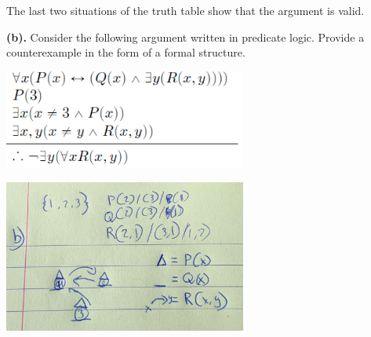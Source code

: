 \documentclass[a4paper]{article}
\begin{document}
The last two situations of the truth table show that the argument is valid.\\

\newpage

\textbf{(b).} Consider the following argument written in predicate logic. Provide a counterexample in the form of a formal structure.\\
\begin{center}
    \includegraphics[width=0.6\textwidth]{images/5b.png}\\[1cm]
\end{center}

\begin{center}
    \includegraphics[width=0.6\textwidth]{images/5ba.jpeg}\\[1cm]
\end{center}
\end{document}
